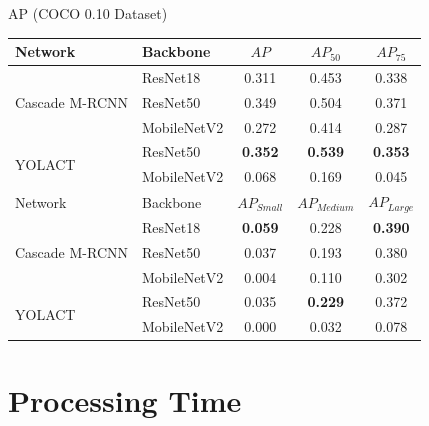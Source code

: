 \documentclass[18pt]{beamer}
\begin{document}
\begin{frame}{AP (COCO 0.10 Dataset)}
\begin{table}[H]
    \centering
    \begin{tabular}{ll | ccc}
        \toprule
        Network                         & Backbone      & $AP$              & $AP_{50}$         & $AP_{75}$ \\
        \midrule
        \multirow{3}{*}{Cascade M-RCNN} & ResNet18      &  0.311 &  0.453 &  0.338 \\
        \multirow{1}{*}{}               & ResNet50      &  0.349 &  0.504 &  0.371\\
        \multirow{1}{*}{}               & MobileNetV2   &  0.272 &  0.414 &  0.287 \\
        \cline{3-5}
        \multirow{2}{*}{YOLACT}         & ResNet50      &  \textbf{0.352} &  \textbf{0.539} &  \textbf{0.353 }\\
        \multirow{1}{*}{}               & MobileNetV2   &  0.068 &  0.169 &  0.045  \\
        \midrule
        Network                         & Backbone      & $AP_{Small}$      & $AP_{Medium}$     & $AP_{Large}$ \\
        \midrule
        \multirow{3}{*}{Cascade M-RCNN} & ResNet18      &  \textbf{0.059} &      0.228 &     \textbf{0.390}\\
        \multirow{1}{*}{}               & ResNet50      &  0.037 &      0.193 &     0.380  \\
        \multirow{1}{*}{}               & MobileNetV2   &   0.004 &      0.110 &     0.302 \\
        \cline{3-5}
        \multirow{2}{*}{YOLACT}         & ResNet50      &  0.035 &      \textbf{0.229} &     0.372  \\
        \multirow{1}{*}{}               & MobileNetV2   &  0.000 &      0.032 &     0.078  \\
        \bottomrule
    \end{tabular}
\end{table}
\end{frame}


\section{Processing Time}
\end{document}
